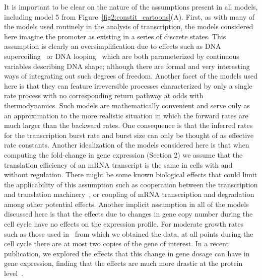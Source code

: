 It is important to be clear on the nature of the assumptions  present in all
models, including model 5 from Figure~\ref{fig2:constit_cartoons}(A). First, as
with many of the models used routinely in the analysis of transcription, the
models considered here imagine the promoter as existing in a series of discrete
states. This assumption is clearly an oversimplification due to effects such as
DNA supercoiling~\cite{Chong2014,Sevier2016} or DNA
looping~\cite{Boedicker2013a} which are both parameterized by  continuous
variables describing DNA shape; although there are formal and very interesting
ways of integrating out such degrees of freedom. Another facet of the models
used here is that they can feature irreversible processes characterized by only
a single rate process with no corresponding return pathway at odds with
thermodynamics. Such models are mathematically convenient and serve only as an
approximation to the more realistic situation in which the forward rates are
much larger than the backward rates. One consequence is that the inferred rates
for the transcription burst rate and burst size  can only be thought of as
effective rate constants. Another idealization of the models considered here is
that when computing the fold-change in gene expression (Section 2) we assume
that the translation efficiency of an mRNA transcript is the same in cells with
and without regulation. There might be some known biological effects that could
limit the applicability of this assumption such as cooperation between the
transcription and translation machinery~\cite{Proshkin2010}, or coupling of mRNA
transcription and degradation~\cite{Chen2015} among other potential effects.
Another implicit assumption in all of the models discussed here is that the
effects due to changes in gene copy number during the cell cycle have no effects
on the expression profile. For moderate growth rates such as those used
in~\cite{Jones2014} from which we obtained the data, at all points during the
cell cycle there are at most two copies of the gene of interest. In a recent
publication, we explored the effects that this change in gene dosage can have in
gene expression, finding that the effects are much more drastic at the protein
level~\cite{Razo-Mejia2020}.


